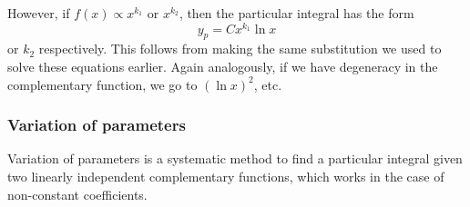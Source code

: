 \documentclass{../template/note}
\begin{document}
    However, if \(f(x) \propto x^{k_1}\) or \(x^{k_2}\), then the particular integral has the form
    \[
        y_p = Cx^{k_1} \ln x
    \]
    or \(k_2\) respectively. This follows from making the same substitution we used to solve these equations earlier. Again analogously, if we have degeneracy in the complementary function, we go to \((\ln x)^2\), etc.
    
    \subsubsection{Variation of parameters}
    
    Variation of parameters is a systematic method to find a particular integral given two linearly independent complementary functions, which works in the case of non-constant coefficients.
\end{document}
